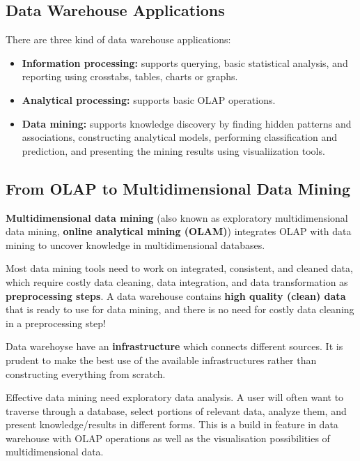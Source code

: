 	\subsection{Data Warehouse Applications}

		There are three kind of data warehouse applications:
		\begin{itemize}
			\item {\bf Information processing:} supports querying, basic statistical analysis,
			and reporting using crosstabs, tables, charts or graphs.
			\item {\bf Analytical processing:} supports basic OLAP operations.
			\item {\bf Data mining:} supports knowledge discovery by finding hidden patterns
			and associations, constructing analytical models, performing classification 
			and prediction, and presenting the mining results using visualiization tools. 
		\end{itemize}

	\subsection{From OLAP to Multidimensional Data Mining}

		{\bf Multidimensional data mining} (also known as exploratory multidimensional data mining,
		{\bf online analytical mining (OLAM)}) integrates OLAP with data mining to 
		uncover knowledge in multidimensional databases. 

		Most data mining tools need to work on integrated, consistent, and cleaned data, which
		require costly data cleaning, data integration, and data transformation as
		{\bf preprocessing steps}. A data warehouse contains {\bf high quality (clean) data} that is ready
		to use for data mining, and there is no need for costly data cleaning in a 
		preprocessing step!

		Data warehoyse have an {\bf infrastructure} which connects different sources. It
		is prudent to make the best use of the available infrastructures rather than constructing
		everything from scratch. 

		Effective data mining need exploratory data analysis. A user will often want to traverse
		through a database, select portions of relevant data, analyze them, and present
		knowledge/results in different forms. This is a build in feature in data warehouse
		with OLAP operations as well as the visualisation possibilities of multidimensional data.

		

